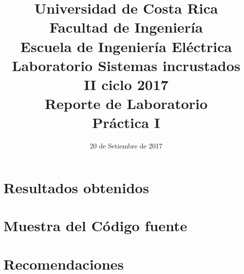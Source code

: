 

\title{Universidad de Costa Rica\\{\small Facultad de Ingeniería\\Escuela de Ingeniería Eléctrica\\
    Laboratorio Sistemas incrustados\\II ciclo 2017\\\vspace*{0.55in} Reporte de Laboratorio}\\ Práctica I \vspace*{1.1in}}
\date{20 de Setiembre de 2017}






\newpage
\section{Resultados obtenidos}


\newpage
\section{Muestra del Código fuente}



\newpage
\section{Recomendaciones}


\newpage


%
%
